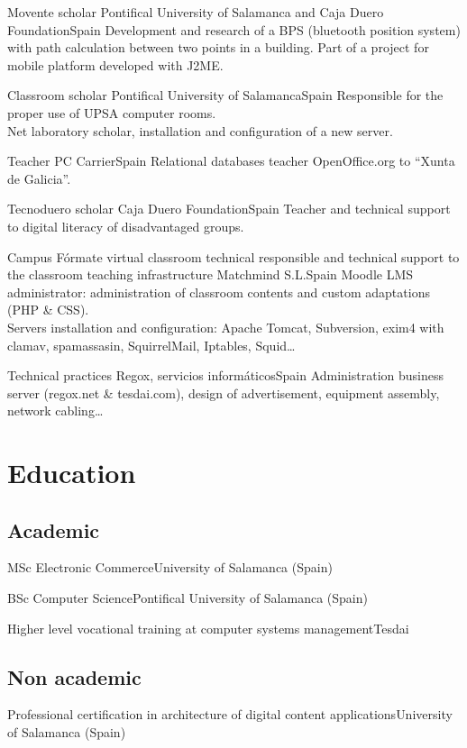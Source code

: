\documentclass[10pt, a4paper]{moderncv}
\begin{document}
{Movente scholar}
{Pontifical University of Salamanca and Caja Duero Foundation}{Spain}{}
{Development and research of a BPS (bluetooth position system) with path
calculation between two points in a building. Part of a project for mobile
platform developed with J2ME.}

{Classroom scholar}
{Pontifical University of Salamanca}{Spain}{}
{Responsible for the proper use of UPSA computer rooms.\\Net laboratory
scholar, installation and configuration of a new server.}

{Teacher}
{PC Carrier}{Spain}{}
{Relational databases teacher OpenOffice.org to ``Xunta de Galicia''.}

{Tecnoduero scholar}
{Caja Duero Foundation}{Spain}{}
{Teacher and technical support to digital literacy of disadvantaged groups.}

{Campus Fórmate virtual classroom technical responsible and technical support
to the classroom teaching infrastructure}
{Matchmind S.L.}{Spain}{}
{Moodle LMS administrator: administration of classroom contents and custom
adaptations (PHP \& CSS). \\ Servers installation and configuration: Apache
Tomcat, Subversion, exim4 with clamav, spamassasin, SquirrelMail, Iptables,
Squid\ldots}

{Technical practices}
{Regox, servicios informáticos}{Spain}{}
{Administration business server (regox.net \& tesdai.com), design of
advertisement, equipment assembly, network cabling\ldots}


%
%

\section{Education}
\subsection{Academic}
{MSc Electronic Commerce}{University of Salamanca (Spain)}{}{}{}

{BSc Computer Science}{Pontifical University of Salamanca (Spain)}{}{}{}

{Higher level vocational training at computer systems management}{Tesdai}{}{}{}

\subsection{Non academic}
{Professional certification in architecture of digital content applications}{University of Salamanca (Spain)}{}{}{}
\end{document}
